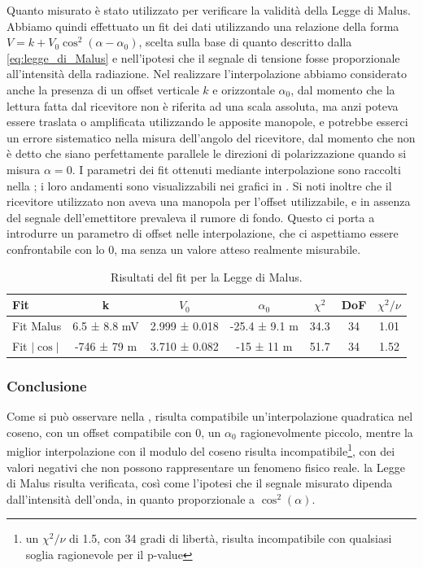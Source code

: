\documentclass[a4paper]{article}
\begin{document}
Quanto misurato è stato utilizzato per verificare la validità della Legge di Malus. Abbiamo quindi effettuato un fit dei dati utilizzando una relazione della forma $V = k+V_0\cos^2(\alpha - \alpha_0)$, scelta sulla base di quanto descritto dalla \cref{eq:legge_di_Malus} e nell'ipotesi che il segnale di tensione fosse proporzionale all'intensità della radiazione. Nel realizzare l'interpolazione abbiamo considerato anche la presenza di un offset verticale $k$ e orizzontale $\alpha_0$, dal momento che la lettura fatta dal ricevitore non è riferita ad una scala assoluta, ma anzi poteva essere traslata o amplificata utilizzando le apposite manopole, e potrebbe esserci un errore sistematico nella misura dell'angolo del ricevitore, dal momento che non è detto che siano perfettamente parallele le direzioni di polarizzazione quando si misura $\alpha = 0$. I parametri dei fit ottenuti mediante interpolazione sono raccolti nella ; i loro andamenti sono visualizzabili nei grafici in . Si noti inoltre che il ricevitore utilizzato non aveva una manopola per l'offset utilizzabile, e in assenza del segnale dell'emettitore prevaleva il rumore di fondo. Questo ci porta a introdurre un parametro di offset nelle interpolazione, che ci aspettiamo essere confrontabile con lo 0, ma senza un valore atteso realmente misurabile.
\begin{table}[htbp]
\centering
\begin{tabular}{|l|cccccc|}
\hline
Fit & k & $V_0$ & $\alpha_0$ & $\chi^2$ & DoF & $\chi^2/\nu$ \\\hline\hline
Fit Malus & 6.5 ± 8.8 mV & 2.999 ± 0.018 & -25.4 ± 9.1 m & 34.3 & 34 & 1.01 \\\hline
Fit $|\cos|$ & -746 ± 79 m & 3.710 ± 0.082 & -15 ± 11 m & 51.7 & 34 & 1.52 \\\hline
\end{tabular}
\caption{Risultati del fit per la Legge di Malus.}
\label{tab:fit_Malus}
\end{table}

\subsubsection{Conclusione}
Come si può osservare nella , risulta compatibile un'interpolazione quadratica nel coseno, con un offset compatibile con 0, un $\alpha_0$ ragionevolmente piccolo, mentre la miglior interpolazione con il modulo del coseno risulta incompatibile\footnote{un $\chi^2/\nu$ di 1.5, con 34 gradi di libertà, risulta incompatibile con qualsiasi soglia ragionevole per il p-value}, con dei valori negativi che non possono rappresentare un fenomeno fisico reale. la Legge di Malus risulta verificata, così come l'ipotesi che il segnale misurato dipenda dall'intensità dell'onda, in quanto proporzionale a $\cos^2(\alpha)$.
\end{document}
